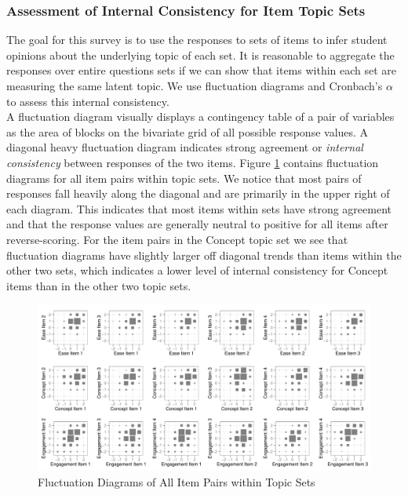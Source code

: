 \documentclass{article}\usepackage[]{graphicx}\usepackage[]{color}
\newenvironment{knitrout}{}{} %
\begin{document}
\subsubsection{Assessment of Internal Consistency for Item Topic Sets} 

The goal for this survey is to use the responses to sets of items to infer student opinions about the underlying topic of each set.  It is reasonable to aggregate the responses over entire questions sets if we can show that items within each set are measuring the same latent topic. We use fluctuation diagrams and Cronbach's $\alpha$ \citep{cronbach:51} to assess this internal consistency. \\

A fluctuation diagram visually displays a contingency table of a pair of variables as  the area of blocks on the bivariate grid of all possible response values. A diagonal heavy fluctuation diagram indicates strong agreement or {\it internal consistency} between responses of the two items.  Figure \ref{fig:fluctuationDiagrams} contains fluctuation diagrams for all item pairs within topic sets.    
We notice that most pairs of responses fall heavily along the diagonal and are primarily in the upper right of each diagram. This indicates that most items within sets have strong agreement and that the response values are generally neutral to positive for all items after reverse-scoring.
For the item pairs in the Concept topic set we see that fluctuation diagrams have slightly larger off diagonal trends than items within the other two sets, which indicates a lower level of internal consistency for Concept items than in the other two topic sets. 

\begin{knitrout}
\color{fgcolor}\begin{figure}[hbt]


{\centering \includegraphics[width=.98\linewidth]{figure/fluctuationDiagrams-1} 

}

\caption[Fluctuation Diagrams of All Item Pairs within Topic Sets]{Fluctuation Diagrams of All Item Pairs within Topic Sets\label{fig:fluctuationDiagrams}}
\end{figure}


\end{knitrout}
\end{document}
